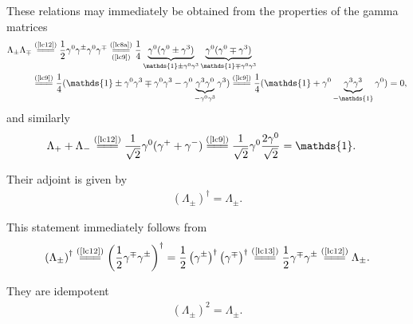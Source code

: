 \begin{note}\noindent
These relations may immediately be obtained from the properties of the gamma matrices
\begin{align*}
\Lambda_\pm\Lambda_\mp&\stackrel{(\text{\cref{lc12}})}{=\joinrel=\joinrel=}\frac{1}{2}\gamma^0\gamma^\pm\gamma^0\gamma^\mp\underset{(\text{\cref{lc9}})}{\stackrel{(\text{\cref{lc8a}})}{=\joinrel=\joinrel=}}\frac{1}{4}\underbrace{\gamma^0(\gamma^0\pm\gamma^3)}_{\mathds{1}\pm\gamma^0\gamma^3}\underbrace{\gamma^0(\gamma^0\mp\gamma^3)}_{\mathds{1}\mp\gamma^0\gamma^3}\\
&\stackrel{(\text{\cref{lc9}})}{=\joinrel=\joinrel=}\frac{1}{4}(\mathds{1}\pm\gamma^0\gamma^3\mp\gamma^0\gamma^3-\gamma^0\underbrace{\gamma^3\gamma^0}_{-\gamma^0\gamma^3}\gamma^3)\stackrel{(\text{\cref{lc9}})}{=\joinrel=\joinrel=}\frac{1}{4}(\mathds{1}+\gamma^0\underbrace{\gamma^3\gamma^3}_{-\mathds{1}}\gamma^0)=0,
\end{align*}
and similarly
\begin{align*}
\Lambda_++\Lambda_-&\stackrel{(\text{\cref{lc12}})}{=\joinrel=\joinrel=}\frac{1}{\sqrt{2}}\gamma^0(\gamma^++\gamma^-)\stackrel{(\text{\cref{lc9}})}{=\joinrel=\joinrel=}\frac{1}{\sqrt{2}}\gamma^0\frac{2\gamma^0}{\sqrt{2}}=\mathds{1}.
\end{align*}
\end{note}
\noindent
Their adjoint is given by
\begin{align}\label{lc14}
\left(\Lambda_\pm\right)^\dag=\Lambda_\pm.
\end{align}

\begin{note}\noindent
This statement immediately follows from
\begin{align*}
\left(\Lambda_\pm\right)^\dag\stackrel{(\text{\cref{lc12}})}{=\joinrel=\joinrel=}\left(\frac{1}{2}\gamma^\mp\gamma^\pm\right)^\dag=\frac{1}{2}\left(\gamma^\pm\right)^\dag\left(\gamma^\mp\right)^\dag\stackrel{(\text{\cref{lc13}})}{=\joinrel=\joinrel=}\frac{1}{2}\gamma^\mp\gamma^\pm\stackrel{(\text{\cref{lc12}})}{=\joinrel=\joinrel=}\Lambda_\pm.
\end{align*}
\end{note}
\noindent
They are idempotent
\begin{align}
\left(\Lambda_\pm\right)^2=\Lambda_\pm.\label{lc17}
\end{align}

